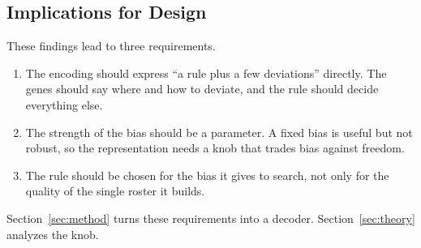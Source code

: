 \subsection{Implications for Design}
\label{sec:repr:implications}

These findings lead to three requirements.
\begin{enumerate}
  \item The encoding should express ``a rule plus a few deviations'' directly. The genes should say where and how to deviate, and the rule should decide everything else.
  \item The strength of the bias should be a parameter. A fixed bias is useful but not robust, so the representation needs a knob that trades bias against freedom.
  \item The rule should be chosen for the bias it gives to search, not only for the quality of the single roster it builds.
\end{enumerate}
Section~\ref{sec:method} turns these requirements into a decoder.
Section~\ref{sec:theory} analyzes the knob.
